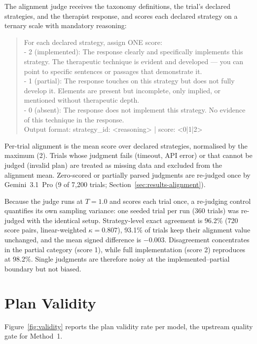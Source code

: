 The alignment judge receives the taxonomy definitions, the trial's declared strategies, and the therapist response, and scores each declared strategy on a ternary scale with mandatory reasoning:

\begin{quote}\small\ttfamily\raggedright
For each declared strategy, assign ONE score:\\
- 2 (implemented): The response clearly and specifically implements this strategy. The therapeutic technique is evident and developed --- you can point to specific sentences or passages that demonstrate it.\\
- 1 (partial): The response touches on this strategy but does not fully develop it. Elements are present but incomplete, only implied, or mentioned without therapeutic depth.\\
- 0 (absent): The response does not implement this strategy. No evidence of this technique in the response.\\[2pt]
Output format: strategy\_id: <reasoning> | score: <0|1|2>
\end{quote}

Per-trial alignment is the mean score over declared strategies, normalised by the maximum (2). Trials whose judgment fails (timeout, API error) or that cannot be judged (invalid plan) are treated as missing data and excluded from the alignment mean. Zero-scored or partially parsed judgments are re-judged once by Gemini~3.1~Pro (9 of 7{,}200 trials; Section~\ref{sec:results-alignment}).

Because the judge runs at $T{=}1.0$ and scores each trial once, a re-judging control quantifies its own sampling variance: one seeded trial per run (360 trials) was re-judged with the identical setup. Strategy-level exact agreement is 96.2\% (720 score pairs, linear-weighted $\kappa = 0.807$), 93.1\% of trials keep their alignment value unchanged, and the mean signed difference is $-0.003$. Disagreement concentrates in the partial category (score 1), while full implementation (score 2) reproduces at 98.2\%. Single judgments are therefore noisy at the implemented--partial boundary but not biased.

\clearpage

\section{Plan Validity}
\label{app:validity}

Figure~\ref{fig:validity} reports the plan validity rate per model, the upstream quality gate for Method~1.

